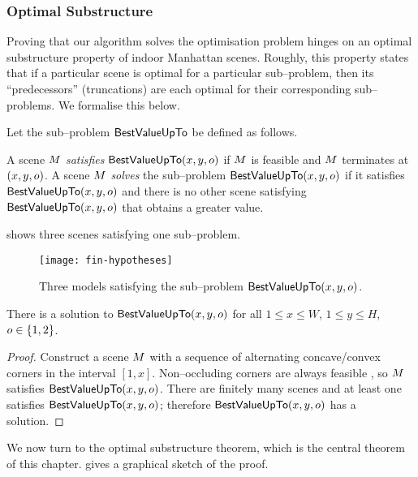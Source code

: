 \subsubsection{Optimal Substructure}

Proving that our algorithm solves the optimisation problem
 hinges on an optimal substructure property of
indoor Manhattan scenes. Roughly, this property states that if a
particular scene is optimal for a particular sub--problem, then its
``predecessors'' (truncations) are each optimal for their
corresponding sub--problems. We formalise this below.

\begin{definition}
  \label{def:sub-problem-in}
  Let the sub--problem $\SubProb$ be defined as follows.

  A scene $\Scene$ \textit{satisfies} $\SubProb(x,y,\WallOrient)$ if
  $\Scene$ is feasible and $\Scene$ terminates at $(x,y,\WallOrient)$.
  A scene $\Scene$ \textit{solves} the sub--problem
  $\SubProb(x,y,\WallOrient)$ if it satisfies
  $\SubProb(x,y,\WallOrient)$ and there is no other scene satisfying
  $\SubProb(x,y,\WallOrient)$ that obtains a greater value.
\end{definition}

 shows three scenes satisfying one
sub--problem.

\begin{figure}[tb]
  \centering
  \texttt{[image: fin-hypotheses]}
  \caption{Three models satisfying the sub--problem
    $\SubProb(x,y,\WallOrient)$.}
  \label{fig:fin-examples}
\end{figure}

\begin{lemma}
  \label{lemma:solutions-exist}
  There is a solution to $\SubProb(x,y,\WallOrient)$ for all $1 \leq x \leq W$,
  $1 \leq y \leq H$, $\WallOrient\in\{1,2\}$.
\end{lemma}
\begin{proof}
  Construct a scene $\Scene$ with a sequence of alternating
  concave/convex corners in the interval $[1,x]$. Non--occluding
  corners are always feasible \cite{Lee09}, so $\Scene$ satisfies
  $\SubProb(x,y,\WallOrient)$. There are finitely many scenes and at
  least one satisfies $\SubProb(x,y,\WallOrient)$; therefore
  $\SubProb(x,y,\WallOrient)$ has a solution.
\end{proof}

We now turn to the optimal substructure theorem, which is the central
theorem of this chapter.  gives a graphical
sketch of the proof.

